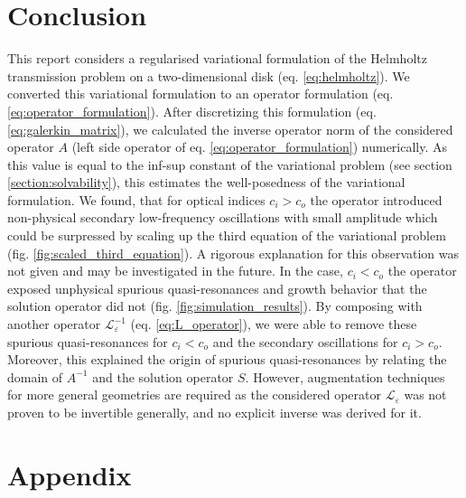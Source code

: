 \documentclass[12pt,journal,compsoc, onecolumn]{IEEEtran}
\begin{document}
\section{Conclusion}
This report considers a regularised variational formulation of the Helmholtz transmission problem on a two-dimensional disk (eq. \ref{eq:helmholtz}). We converted this variational formulation to an operator formulation (eq. \ref{eq:operator_formulation}). After discretizing this formulation (eq. \ref{eq:galerkin_matrix}), we calculated the inverse operator norm of the considered operator $A$ (left side operator of eq. \ref{eq:operator_formulation}) numerically. As this value is equal to the inf-sup constant of the variational problem (see section \ref{section:solvability}), this estimates the well-posedness of the variational formulation. We found, that for optical indices $c_i > c_o$ the operator introduced non-physical secondary low-frequency oscillations with small amplitude which could be surpressed by scaling up the third equation of the variational problem (fig. \ref{fig:scaled_third_equation}). A rigorous explanation for this observation was not given and may be investigated in the future.  
In the case, $c_i < c_o$ the operator exposed unphysical spurious quasi-resonances and growth behavior that the solution operator did not (fig. \ref{fig:simulation_results}). By composing with another operator $\mathcal{L}_\varepsilon^{-1}$ (eq. \ref{eq:L_operator}), we were able to remove these spurious quasi-resonances for $c_i < c_o$ and the secondary oscillations for $c_i > c_o$. Moreover, this explained the origin of spurious quasi-resonances by relating the domain of $A^{-1}$ and the solution operator $S$. However, augmentation techniques for more general geometries are required as the considered operator $\mathcal{L}_\varepsilon$ was not proven to be invertible generally, and no explicit inverse was derived for it. 

\section{Appendix}
\label{section:appendix}
\end{document}
